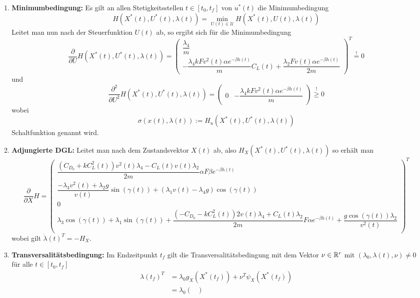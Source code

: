 \begin{enumerate}
\item \textbf{Minimumbedingung:} Es gilt an allen Stetigkeitsstellen $t \in [t_0,t_f]$ von $u^{\ast}(t)$ die Minimumbedingung \[H(X^{\ast}(t),U^{\ast}(t),\lambda(t)) = \min_{U(t) \in \mathcal{U}} H(X^{\ast}(t),U(t),\lambda(t))\] Leitet man nun nach der Steuerfunktion $U(t)$ ab, so ergibt sich für die Minimumbedingung
\[\dfrac{\partial}{\partial U} H(X^{\ast}(t),U^{\ast}(t),\lambda(t)) = \begin{pmatrix}
\dfrac{\lambda_4}{m} \\ 
- \dfrac{\lambda_4 k F v^2(t) \alpha e^{-\beta h(t)}}{m} C_L(t)  + \dfrac{\lambda_2 F v(t) \alpha e^{-\beta h(t)}}{2m}
\end{pmatrix}^T \stackrel{!}{=} 0\]
und 
\[\dfrac{\partial^2}{\partial U^2} H(X^{\ast}(t),U^{\ast}(t),\lambda(t)) = \begin{pmatrix}
0 & - \dfrac{\lambda_4 k F v^2(t) \alpha e^{-\beta h(t)}}{m} 
\end{pmatrix} \stackrel{!}{\geq} 0\] wobei \[\sigma(x(t),\lambda(t)) := H_u(X^{\ast}(t),U^{\ast}(t),\lambda(t))\] Schaltfunktion genannt wird.
%
\item \textbf{Adjungierte DGL:} Leitet man nach dem Zustandsvektor $X(t)$ ab, also $H_{X}(X^{\ast}(t),U^{\ast}(t),\lambda(t))$ so erhält man 
\[\dfrac{\partial}{\partial X} H = \begin{pmatrix}
\dfrac{(C_{D_0}+k C_L^2(t)) v^2(t) \lambda_4 - C_L(t) v(t) \lambda_2}{2m} \alpha F \beta e^{-\beta h(t)}\\ 
\dfrac{- \lambda_3 v^2(t) + \lambda_2 g}{v(t)} \sin(\gamma(t)) + (\lambda_1 v(t) - \lambda_4 g) \cos(\gamma(t)) \\
0 \\ 
\lambda_3 \cos(\gamma(t)) + \lambda_1 \sin(\gamma(t)) + \dfrac{(-C_{D_0}-k C_L^2(t)) 2 v(t) \lambda_4 + C_L(t) \lambda_2}{2m}   F \alpha e^{-\beta h(t)} + \dfrac{g \cos(\gamma(t)) \lambda_2}{v^2(t)} \\
\end{pmatrix}^T \]
wobei gilt $\dot{\lambda}(t)^T = -H_{X}$.
%
\item \textbf{Transversalitätsbedingung:} Im Endzeitpunkt $t_f$ gilt die Transversalitätsbedingung mit dem Vektor $\nu \in \mathbb{R}^r$ mit $(\lambda_0,\lambda(t),\nu) \neq 0$ für alle $t \in [t_0,t_f]$
\[\begin{split}
\lambda(t_f)^T &= \lambda_0 g_X(X^{\ast}(t_f)) + \nu^T \psi_X(X^{\ast}(t_f)) \\\
&= \lambda_0 \begin{pmatrix}

\end{pmatrix}
\end{split}\]
\end{enumerate}
